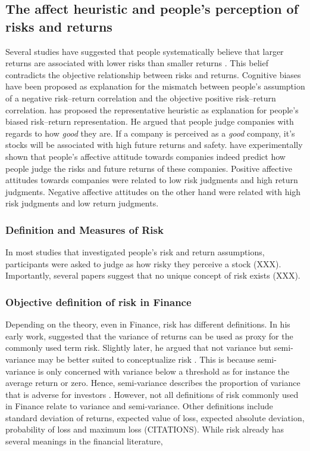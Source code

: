 \documentclass[a4paper,doc, natbib]{apa6} %
\begin{document}
\subsection{The affect heuristic and people's perception of risks and returns}
Several studies have suggested that people systematically believe that larger returns are associated with lower risks than smaller returns \citep[e.g.][]{Shefrin2001}. This belief contradicts the objective relationship between risks and returns. Cognitive biases have been proposed as explanation for the mismatch between people's assumption of a negative risk--return correlation and the objective positive risk--return correlation. \cite{Shefrin2001} has proposed the representative heuristic as explanation for people's biased risk--return representation. He argued that people judge companies with regards to how \textit{good} they are. If a company is perceived as a \textit{good} company, it's stocks will be associated with high future returns and safety. \cite{Kempf2014} have experimentally shown that people's affective attitude towards companies indeed predict how people judge the risks and future returns of these companies. Positive affective attitudes towards companies were related to low risk judgments and high return judgments. Negative affective attitudes on the other hand were related with high risk judgments and low return judgments. 

\subsubsection{Definition and Measures of Risk}
In most studies that investigated people's risk and return assumptions, participants were asked to judge as how risky they perceive a stock (XXX). Importantly, several papers suggest that no unique concept of risk exists (XXX).

\subsubsection{Objective definition of risk in Finance}
Depending on the theory, even in Finance, risk has different definitions. In his early work, \cite{Markowitz1952}%
suggested that the variance of returns can be used as proxy for the commonly used term risk. Slightly later, he argued that not variance but semi-variance may be better suited to conceptualize risk \citep{Markowitz1959}. This is because semi-variance is only concerned with variance below a threshold as for instance the average return or zero. Hence, semi-variance describes the proportion of variance that is adverse for investors \citep{Markowitz1991}. However, not all definitions of risk commonly used in Finance relate to variance and semi-variance. Other definitions include standard deviation of returns, expected value of loss, expected absolute deviation, probability of loss and maximum loss (CITATIONS).
While risk already has several meanings in the financial literature, 
\end{document}
